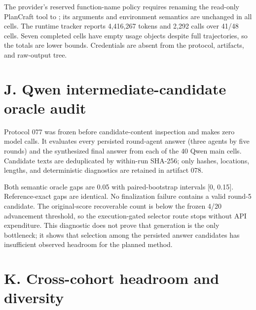\documentclass{article}
\begin{document}
The provider's reserved function-name policy requires renaming the read-only PlanCraft \texttt{} tool to \texttt{}; its arguments and environment semantics are unchanged in all cells. The runtime tracker reports 4,416,267 tokens and 2,292 calls over 41/48 cells. Seven completed cells have empty usage objects despite full trajectories, so the totals are lower bounds. Credentials are absent from the protocol, artifacts, and raw-output tree.

\section{J. Qwen intermediate-candidate oracle audit}

Protocol 077 was frozen before candidate-content inspection and makes zero model calls. It evaluates every persisted round-agent answer (three agents by five rounds) and the synthesized final answer from each of the 40 Qwen main cells. Candidate texts are deduplicated by within-run SHA-256; only hashes, locations, lengths, and deterministic diagnostics are retained in artifact 078.

\begin{center}
\end{center}

Both semantic oracle gaps are 0.05 with paired-bootstrap intervals [0, 0.15]. Reference-exact gaps are identical. No finalization failure contains a valid round-5 candidate. The original-score recoverable count is below the frozen 4/20 advancement threshold, so the execution-gated selector route stops without API expenditure. This diagnostic does not prove that generation is the only bottleneck; it shows that selection among the persisted answer candidates has insufficient observed headroom for the planned method.

\section{K. Cross-cohort headroom and diversity}
\end{document}
